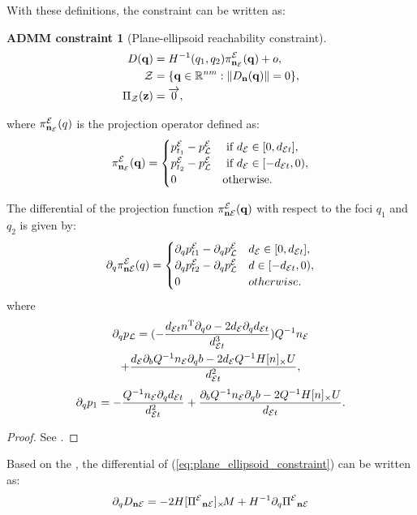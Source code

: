\documentclass[10pt,twocolumn,twoside]{IEEEtran}
\newtheorem{constraint}{ADMM constraint}
\def\sZ{\mathcal{Z}}
\begin{document}
With these definitions, the constraint can be written as:
\begin{constraint}[Plane-ellipsoid reachability constraint]
\begin{align}
D(\vq) &= H^{-1}(q_{1},q_2)\pi^\cE_{\vn_\cE}(\vq)+o, \label{eq:plane_ellipsoid_constraint}\\
  \sZ &= \{\vq\in\mathbb{R}^{nm}:\norm{D_{\vn}(\vq)} = 0 \},\\
   \Pi_\sZ(\vz) & = \overrightarrow{0}, 
\end{align}
\end{constraint}
where $\pi^{\mathcal{E}}_{\mathbf{n}_{\mathcal{E}}}(q)$ is the projection operator defined as:
  \begin{equation}\label{equ:plane2ellipse}
    \pi^{\mathcal{E}}_{\mathbf{n}_{\mathcal{E}}}(\mathbf{q}) =\begin{cases}
      p^{\mathcal{E}}_{t_1}-p^{\mathcal{E}}_{\mathcal{L}} & \textrm{ if } d_{\mathcal{E}} \in [0, d_{\mathcal{E} t}], \\
      p^{\mathcal{E}}_{t_2}-p^{\mathcal{E}}_{\mathcal{L}} &  \textrm{ if } d_{\mathcal{E}} \in [- d_{\mathcal{E} t},0), \\
      {0} & \textrm{otherwise}.
    \end{cases}
  \end{equation}

  \begin{proposition}\label{prop:dpi_ne_dt}
    The differential of the projection function $\pi^{\mathcal{E}}_{\mathbf{n} \mathcal{E}}(\mathbf{q})$ with respect to the foci $q_1$ and $q_2$ is given by:
    \begin{equation}
      \partial_q \pi^{\mathcal{E}}_{\mathbf{n} \mathcal{E}}(q) = \begin{cases}
        \partial_q p^{\mathcal{E}}_{t1}-\partial_q p^{\mathcal{E}}_{\mathcal{L}} &  d_{\mathcal{E}} \in [0, d_{\mathcal{E} t}], \\
        \partial_q p^{\mathcal{E}}_{t2}-\partial_q p^{\mathcal{E}}_{\mathcal{L}} &  d \in [- d_{\mathcal{E} t},0), \\
        {0} & otherwise.
      \end{cases}
    \end{equation}
    where
    \begin{multline}
      \partial_q p_{\mathcal{L}} =   (-\frac{d_{\mathcal{E} t} n^\mathrm{T} \partial_q o -2d_{\mathcal{E}} \partial_q d_{\mathcal{E} t}}{d_{\mathcal{E} t}^3} )Q^{-1}n_{\mathcal{E}} \\
      + \frac{d_{\mathcal{E}}\partial_b Q^{-1} n_{\mathcal{E}} \partial_q b -  2d_{\mathcal{E}} Q^{-1}H[n]_\times U}{d_{\mathcal{E} t}^2},
    \end{multline}
    \begin{equation}
      \partial_q p_{1} =  -\frac{Q^{-1}n_{\mathcal{E}} \partial_q d_{\mathcal{E} t} }{d_{\mathcal{E} t}^2} 
      + \frac{\partial_b Q^{-1}n_{\mathcal{E}} \partial_q b -  2Q^{-1}H[n]_\times U }{d_{\mathcal{E} t}}.
    \end{equation}
  \end{proposition}
  \begin{proof}
  See .
  \end{proof}
  Based on the , the differential of (\ref{eq:plane_ellipsoid_constraint}) can be written as:
  \begin{equation}
    \partial_q {D_{\mathbf{n}\mathcal{E}}} = -2 H [{\Pi^{\mathcal{E}}}_{\mathbf{n} \mathcal{E}}]_{\times}\!  M + H^{-1}\partial_q {\Pi^{\mathcal{E}}}_{\mathbf{n} \mathcal{E}}
  \end{equation}
\end{document}

